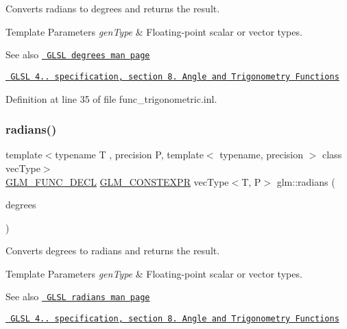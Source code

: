 Converts radians to degrees and returns the result.


\begin{DoxyTemplParams}{Template Parameters}
{\em gen\+Type} & Floating-\/point scalar or vector types.\\
\hline
\end{DoxyTemplParams}
\begin{DoxySeeAlso}{See also}
\href{http://www.opengl.org/sdk/docs/manglsl/xhtml/degrees.xml}{\texttt{ G\+L\+SL degrees man page}} 

\href{http://www.opengl.org/registry/doc/GLSLangSpec.4.20.8.pdf}{\texttt{ G\+L\+SL 4.. specification, section 8. Angle and Trigonometry Functions}} 
\end{DoxySeeAlso}


Definition at line 35 of file func\+\_\+trigonometric.\+inl.

\mbox{\label{group__core__func__trigonometric_gafffb5e533f75318bdf4e0967d8a6c05c}} 
\subsubsection{\texorpdfstring{radians()}{radians()}}
{\footnotesize\ttfamily template$<$typename T , precision P, template$<$ typename, precision $>$ class vec\+Type$>$ \\
\mbox{\hyperlink{setup_8hpp_ab2d052de21a70539923e9bcbf6e83a51}{G\+L\+M\+\_\+\+F\+U\+N\+C\+\_\+\+D\+E\+CL}} \mbox{\hyperlink{setup_8hpp_a08b807947b47031d3a511f03f89645ad}{G\+L\+M\+\_\+\+C\+O\+N\+S\+T\+E\+X\+PR}} vec\+Type$<$T, P$>$ glm\+::radians (\begin{DoxyParamCaption}\item[{vec\+Type$<$ T, P $>$ const \&}]{degrees }\end{DoxyParamCaption})}

Converts degrees to radians and returns the result.


\begin{DoxyTemplParams}{Template Parameters}
{\em gen\+Type} & Floating-\/point scalar or vector types.\\
\hline
\end{DoxyTemplParams}
\begin{DoxySeeAlso}{See also}
\href{http://www.opengl.org/sdk/docs/manglsl/xhtml/radians.xml}{\texttt{ G\+L\+SL radians man page}} 

\href{http://www.opengl.org/registry/doc/GLSLangSpec.4.20.8.pdf}{\texttt{ G\+L\+SL 4.. specification, section 8. Angle and Trigonometry Functions}} 
\end{DoxySeeAlso}



